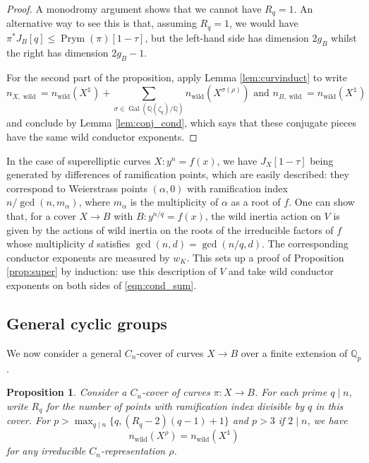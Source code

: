 \documentclass[12pt]{amsart}
\newtheorem{proposition}[theorem]{Proposition}
\theoremstyle{definition}
\newenvironment{remark}
  {\pushQED{\qed}\renewcommand{\qedsymbol}{$\diamondsuit$}\remarkx}
  {\popQED\endremarkx}
\theoremstyle{remark}
\newcommand{\QQ}{\mathbb{Q}}
\DeclareMathOperator{\Gal}{Gal}
\DeclareMathOperator{\Prym}{Prym}
\DeclareMathOperator{\wild}{wild}
\DeclareMathOperator{\one}{\mathds{1}}
\begin{document}
\begin{proof}
    A monodromy argument shows that we cannot have $R_q=1$. An alternative way to see this is that, assuming $R_q=1$, we would have $\pi^*J_B[q]\le \Prym(\pi)[1-\tau]$, but the left-hand side has dimension $2g_B$ whilst the right has dimension $2g_B-1$. 

    For the second part of the proposition, apply Lemma \ref{lem:curvinduct} to write 
    \[n_{X,\wild}=n_{\wild}(X^{\one})+\sum_{\sigma\in\Gal(\QQ(\zeta_q)/\QQ)}n_{\wild}(X^{\sigma(\rho)}) \text{ and } n_{B,\wild}= n_{\wild}(X^{\one})\]
    and conclude by Lemma \ref{lem:conj_cond}, which says that these conjugate pieces have the same wild conductor exponents.
\end{proof}

\begin{remark}\label{rmk:super}
    In the case of superelliptic curves $X: y^n=f(x)$, we have $J_X[1-\tau]$ being generated by differences of ramification points, which are easily described: they correspond to Weierstrass points $(\alpha,0)$ with ramification index $n/\gcd(n,m_\alpha)$, where $m_\alpha$ is the multiplicity of $\alpha$ as a root of $f$. One can show that, for a cover $X\to B$ with $B: y^{n/q}=f(x)$, the wild inertia action on $V$ is given by the actions of wild inertia on the roots of the irreducible factors of $f$ whose multiplicity $d$ satisfies $\gcd(n,d)=\gcd(n/q,d)$. The corresponding conductor exponents are measured by $w_K$. This sets up a proof of Proposition \ref{prop:super} by induction: use this description of $V$ and take wild conductor exponents on both sides of \eqref{eqn:cond_sum}.
\end{remark}

\subsection{General cyclic groups}
We now consider a general $C_n$-cover of curves $X\to B$ over a finite extension of $\QQ_p$.

\begin{proposition}\label{prop:cylic_general}
    Consider a $C_n$-cover of curves $\pi:X\to B$. For each prime $q\mid n$, write $R_q$ for the number of points with ramification index divisible by $q$ in this cover. For $p>\max_{q\mid n}\{q,(R_q-2)(q-1)+1\}$ and $p>3$ if $2\mid n$, we have
    \[n_{\wild}(X^\rho)=n_{\wild}(X^{\one})\]
    for any irreducible $C_n$-representation $\rho$. 
\end{proposition}
\end{document}
